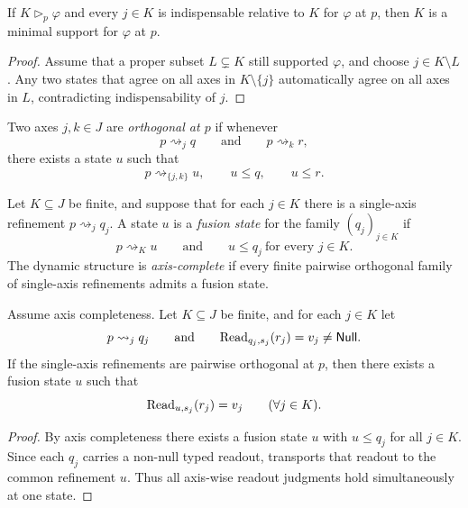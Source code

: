 \begin{proposition}\label{prop:indispensability-implies-minimality}
If $K\triangleright_p\varphi$ and every $j\in K$ is indispensable relative to $K$ for $\varphi$ at $p$, then $K$ is a minimal support for $\varphi$ at $p$.
\end{proposition}

\begin{proof}
Assume that a proper subset $L\subsetneq K$ still supported $\varphi$, and choose $j\in K\setminus L$. Any two states that agree on all axes in $K\setminus\{j\}$ automatically agree on all axes in $L$, contradicting indispensability of $j$.
\end{proof}

\begin{definition}[Orthogonality]\label{def:axis-orthogonality}
Two axes $j,k\in J$ are \emph{orthogonal at $p$} if whenever
\[
p\rightsquigarrow_j q
\qquad\text{and}\qquad
p\rightsquigarrow_k r,
\]
there exists a state $u$ such that
\[
p\rightsquigarrow_{\{j,k\}} u,
\qquad
u\le q,
\qquad
u\le r.
\]
\end{definition}

\begin{definition}\label{def:fusion-state}
Let $K\subseteq J$ be finite, and suppose that for each $j\in K$ there is a single-axis refinement $p\rightsquigarrow_j q_j$. A state $u$ is a \emph{fusion state} for the family $(q_j)_{j\in K}$ if
\[
p\rightsquigarrow_K u
\qquad\text{and}\qquad
u\le q_j\ \text{for every }j\in K.
\]
The dynamic structure is \emph{axis-complete} if every finite pairwise orthogonal family of single-axis refinements admits a fusion state.
\end{definition}

\begin{corollary}\label{cor:explicit-lifting}
Assume axis completeness. Let $K\subseteq J$ be finite, and for each $j\in K$ let
\[
p\rightsquigarrow_j q_j
\qquad\text{and}\qquad
\mathrm{Read}_{q_j,s_j}(r_j)=v_j\neq \mathsf{Null}.
\]
If the single-axis refinements are pairwise orthogonal at $p$, then there exists a fusion state $u$ such that
\[
\mathrm{Read}_{u,s_j}(r_j)=v_j
\qquad
(\forall j\in K).
\]
\end{corollary}

\begin{proof}
By axis completeness there exists a fusion state $u$ with $u\le q_j$ for all $j\in K$. Since each $q_j$ carries a non-null typed readout,  transports that readout to the common refinement $u$. Thus all axis-wise readout judgments hold simultaneously at one state.
\end{proof}

